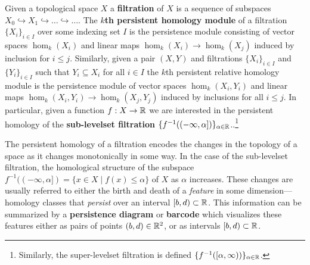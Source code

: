 
Given a topological space $X$ a \textbf{filtration} of $X$ is a sequence of subspaces $X_0\hookrightarrow X_1\hookrightarrow\ldots\hookrightarrow\ldots$.
The \textbf{$k$th persistent homology module} of a filtration $\{X_i\}_{i\in I}$ over some indexing set $I$ is the persistence module consisting of vector spaces $\hom_k(X_i)$ and linear maps $\hom_k(X_i)\to \hom_k(X_j)$ induced by inclusion for $i\leq j$.
Similarly, given a pair $(X,Y)$ and filtrations $\{X_i\}_{i\in I}$ and $\{Y_i\}_{i\in I}$ such that $Y_i\subseteq X_i$ for all $i\in I$ the $k$th persistent relative homology module is the persistence module of vector spaces $\hom_k(X_i, Y_i)$ and linear maps $\hom_k(X_i, Y_i)\to\hom_k(X_j, Y_j)$ induced by inclusions for all $i\leq j$.
In particular, given a function $f: X\to \mathbb{R}$ we are interested in the persistent homology of the \textbf{sub-levelset filtration} $\{f^{-1}((-\infty, \alpha])\}_{\alpha\in\mathbb{R}}$..\footnote{Similarly, the super-levelset filtration is defined $\{f^{-1}([\alpha,\infty))\}_{\alpha\in\mathbb{R}}$.}

The persistent homology of a filtration encodes the changes in the topology of a space as it changes monotonically in some way.
In the case of the sub-levelset filtration, the homological structure of the subspace $f^{-1}((-\infty,\alpha]) = \{x\in X\mid f(x) \leq \alpha\}$ of $X$ as $\alpha$ increases.
These changes are usually referred to either the birth and death of a \emph{feature} in some dimension---homology classes that \emph{persist} over an interval $[b, d)\subset\mathbb{R}$.
This information can be summarized by a \textbf{persistence diagram} or \textbf{barcode} which visualizes these features either as pairs of points $(b, d)\in\mathbb{R}^2$, or as intervals $[b, d)\subset\mathbb{R}$.
